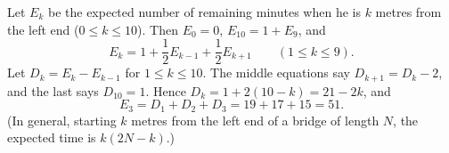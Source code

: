 Let $E_k$ be the expected number of remaining minutes when he is $k$ metres from the left end ($0\le k\le10$). Then $E_0=0$, $E_{10}=1+E_9$, and
\[E_k=1+\dfrac12E_{k-1}+\dfrac12E_{k+1}\qquad(1\le k\le9).\]
Let $D_k=E_k-E_{k-1}$ for $1\le k\le10$. The middle equations say $D_{k+1}=D_k-2$, and the last says $D_{10}=1$. Hence $D_k=1+2(10-k)=21-2k$, and
\[E_3=D_1+D_2+D_3=19+17+15=\boxed{51}.\]
(In general, starting $k$ metres from the left end of a bridge of length $N$, the expected time is $k(2N-k)$.)
